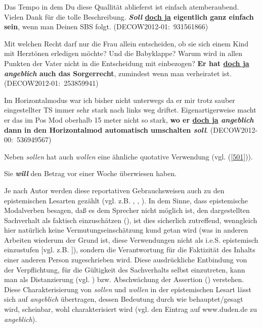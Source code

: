 \begin{exe}
	\ex\label{498} 
	\scriptsize
	Das Tempo in dem Du diese Quallität ablieferst ist einfach atemberaubend. Vielen Dank für die tolle Beschreibung. \textbf{\textit{Soll} 					\underline{doch ja} eigentlich ganz einfach sein}, wenn man Deinen SBS folgt.  
	\newline
	\hbox{}\hfill\hbox{(DECOW2012-01: 931561866)}	
\end{exe}

\begin{exe}
	\ex\label{499} 
	\scriptsize
	Mit welchen Recht darf nur die Frau allein entscheiden, ob sie sich einem Kind mit Herztönen erledigen möchte? Und die Babyklappe? Warum wird in allen 	Punkten der Vater nicht in die Entscheidung mit einbezogen? \textbf{Er hat \underline{doch ja} \textit{angeblich} auch das \glqq Sorgerrecht\grqq{}}, 		zumindest wenn man verheiratet ist.
	\hfill\hbox{(DECOW2012-01: 253859941)}	
\end{exe}
												                    
\begin{exe}
	\ex\label{500} 
	\scriptsize
	Im Horizontalmodus war ich bisher nicht unterwegs da er mir trotz sauber eingestellter TS immer sehr stark nach links weg driftet. Eigenartigerweise 		macht er das im Pos Mod oberhalb 15 meter nicht so stark, \textbf{wo er \underline{doch ja} \textit{angeblich} dann in den Horizontalmod automatisch 		umschalten \textit{soll}}. 	
	\newline
	\hbox{}\hfill\hbox{(DECOW2012-00: 536949567)}	
\end{exe}		      								   				  
Neben \textit{sollen} hat auch \textit{wollen} eine ähnliche quotative Verwendung (vgl. (\ref{501})).

\begin{exe}
	\ex\label{501} 
	Sie \textbf{\textit{will}} den Betrag vor einer Woche überwiesen haben.
\end{exe}	
Je nach Autor werden diese reportativen Gebrauchsweisen auch zu den epistemischen Lesarten  gezählt (vgl. z.B. \citealt[235]{Oehlschlaeger1989}, \citealt[218, 119-220]{Diewald1993}, \citealt[20]{Heine1995}). In dem Sinne, dass epistemische Modalverben \glqq besagen, daß es dem Sprecher nicht möglich ist, den dargestellten Sachverhalt als faktisch einzuschätzen\grqq{} (\citealt[221]{Diewald1993}), ist dies sicherlich zutreffend, wenn\-gleich hier natürlich keine Vermutungseinschätzung kund getan wird (was in anderen Arbeiten wiederum der Grund ist, diese Verwendungen nicht als i.e.S. epistemisch einzustufen $[$vgl. z.B. \citealt[41]{Mache2009}$]$), sondern die Verantwortung für die Faktizität des Inhalts einer anderen Person zugeschrieben wird. Diese ausdrückliche Entbindung von der Verpflichtung, für die Gültigkeit des Sachverhalts selbst einzutreten, kann man als Distanzierung (vgl. \citealt[49]{Bruenner1983}) bzw. \glqq Abschwächung der Assertion\grqq{} (\citealt[103]{Glas1984}) verstehen. Diese Charakterisierung von \textit{sollen} und \textit{wollen} in der epistemischen Lesart lässt sich auf \textit{angeblich} übertragen, dessen Bedeutung durch \glq wie behauptet/gesagt wird\grq {}, \glq scheinbar\grq {}, \glq wohl\grq {} charakterisiert wird (vgl. den Eintrag auf www.duden.de zu \textit{angeblich}). 

